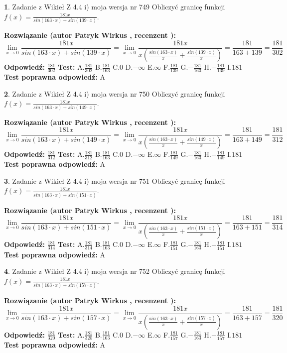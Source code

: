 \documentclass[12pt, a4paper]{article}
\theoremstyle{definition} %
\newtheorem{zad}{}
\newcommand{\zadStart}[1]{\begin{zad}#1\newline}
\newcommand{\zadStop}{\end{zad}}
\newcommand{\rozwStart}[2]{\noindent \textbf{Rozwiązanie (autor #1 , recenzent #2): }\newline}
\newcommand{\rozwStop}{\newline}
\newcommand{\odpStart}{\noindent \textbf{Odpowiedź:}\newline}
\newcommand{\odpStop}{\newline}
\newcommand{\testStart}{\noindent \textbf{Test:}\newline}
\newcommand{\testStop}{\newline}
\newcommand{\kluczStart}{\noindent \textbf{Test poprawna odpowiedź:}\newline}
\newcommand{\kluczStop}{\newline}
\begin{document}
\zadStart{Zadanie z Wikieł Z 4.4 i) moja wersja nr 749}
Obliczyć granicę funkcji $f(x)=\frac{181x}{sin(163\cdot x) +sin(139\cdot x)}$.
\zadStop
\rozwStart{Patryk Wirkus}{}
$$\lim\limits_{x\to 0}\frac{181x}{sin(163\cdot x) +sin(139\cdot x)}=\lim\limits_{x\to 0}\frac{181x}{x(\frac{sin(163\cdot x)}{x}+\frac{sin(139\cdot x)}{x})}=\frac{181}{163+139} = \frac{181}{302}$$
\rozwStop
\odpStart
$\frac{181}{302}$
\odpStop
\testStart
A.$\frac{181}{302}$
B.$\frac{181}{163}$
C.$0$
D.$-\infty$
E.$\infty$
F.$\frac{181}{139}$
G.$-\frac{181}{163}$
H.$-\frac{181}{139}$
I.$181$
\testStop
\kluczStart
A
\kluczStop



\zadStart{Zadanie z Wikieł Z 4.4 i) moja wersja nr 750}
Obliczyć granicę funkcji $f(x)=\frac{181x}{sin(163\cdot x) +sin(149\cdot x)}$.
\zadStop
\rozwStart{Patryk Wirkus}{}
$$\lim\limits_{x\to 0}\frac{181x}{sin(163\cdot x) +sin(149\cdot x)}=\lim\limits_{x\to 0}\frac{181x}{x(\frac{sin(163\cdot x)}{x}+\frac{sin(149\cdot x)}{x})}=\frac{181}{163+149} = \frac{181}{312}$$
\rozwStop
\odpStart
$\frac{181}{312}$
\odpStop
\testStart
A.$\frac{181}{312}$
B.$\frac{181}{163}$
C.$0$
D.$-\infty$
E.$\infty$
F.$\frac{181}{149}$
G.$-\frac{181}{163}$
H.$-\frac{181}{149}$
I.$181$
\testStop
\kluczStart
A
\kluczStop



\zadStart{Zadanie z Wikieł Z 4.4 i) moja wersja nr 751}
Obliczyć granicę funkcji $f(x)=\frac{181x}{sin(163\cdot x) +sin(151\cdot x)}$.
\zadStop
\rozwStart{Patryk Wirkus}{}
$$\lim\limits_{x\to 0}\frac{181x}{sin(163\cdot x) +sin(151\cdot x)}=\lim\limits_{x\to 0}\frac{181x}{x(\frac{sin(163\cdot x)}{x}+\frac{sin(151\cdot x)}{x})}=\frac{181}{163+151} = \frac{181}{314}$$
\rozwStop
\odpStart
$\frac{181}{314}$
\odpStop
\testStart
A.$\frac{181}{314}$
B.$\frac{181}{163}$
C.$0$
D.$-\infty$
E.$\infty$
F.$\frac{181}{151}$
G.$-\frac{181}{163}$
H.$-\frac{181}{151}$
I.$181$
\testStop
\kluczStart
A
\kluczStop



\zadStart{Zadanie z Wikieł Z 4.4 i) moja wersja nr 752}
Obliczyć granicę funkcji $f(x)=\frac{181x}{sin(163\cdot x) +sin(157\cdot x)}$.
\zadStop
\rozwStart{Patryk Wirkus}{}
$$\lim\limits_{x\to 0}\frac{181x}{sin(163\cdot x) +sin(157\cdot x)}=\lim\limits_{x\to 0}\frac{181x}{x(\frac{sin(163\cdot x)}{x}+\frac{sin(157\cdot x)}{x})}=\frac{181}{163+157} = \frac{181}{320}$$
\rozwStop
\odpStart
$\frac{181}{320}$
\odpStop
\testStart
A.$\frac{181}{320}$
B.$\frac{181}{163}$
C.$0$
D.$-\infty$
E.$\infty$
F.$\frac{181}{157}$
G.$-\frac{181}{163}$
H.$-\frac{181}{157}$
I.$181$
\testStop
\kluczStart
A
\kluczStop
\end{document}
